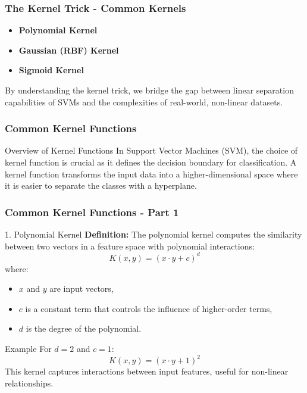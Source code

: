 \documentclass{beamer}
\begin{document}
\begin{frame}[fragile]
    \frametitle{The Kernel Trick - Common Kernels}
    \begin{itemize}
        \item \textbf{Polynomial Kernel}
        \item \textbf{Gaussian (RBF) Kernel}
        \item \textbf{Sigmoid Kernel}
    \end{itemize}
    By understanding the kernel trick, we bridge the gap between linear separation capabilities of SVMs and the complexities of real-world, non-linear datasets.
\end{frame}

\begin{frame}[fragile]
    \frametitle{Common Kernel Functions}
    \begin{block}{Overview of Kernel Functions}
        In Support Vector Machines (SVM), the choice of kernel function is crucial as it defines the decision boundary for classification. 
        A kernel function transforms the input data into a higher-dimensional space where it is easier to separate the classes with a hyperplane.
    \end{block}
\end{frame}

\begin{frame}[fragile]
    \frametitle{Common Kernel Functions - Part 1}
    \begin{block}{1. Polynomial Kernel}
        \textbf{Definition:}
        The polynomial kernel computes the similarity between two vectors in a feature space with polynomial interactions:
        \begin{equation}
        K(x, y) = (x \cdot y + c)^d
        \end{equation}
        where:
        \begin{itemize}
            \item \( x \) and \( y \) are input vectors,
            \item \( c \) is a constant term that controls the influence of higher-order terms,
            \item \( d \) is the degree of the polynomial.
        \end{itemize}
    \end{block}
    
    \begin{block}{Example}
        For \( d = 2 \) and \( c = 1 \):
        \begin{equation}
        K(x, y) = (x \cdot y + 1)^2
        \end{equation}
        This kernel captures interactions between input features, useful for non-linear relationships.
    \end{block}
\end{frame}
\end{document}
